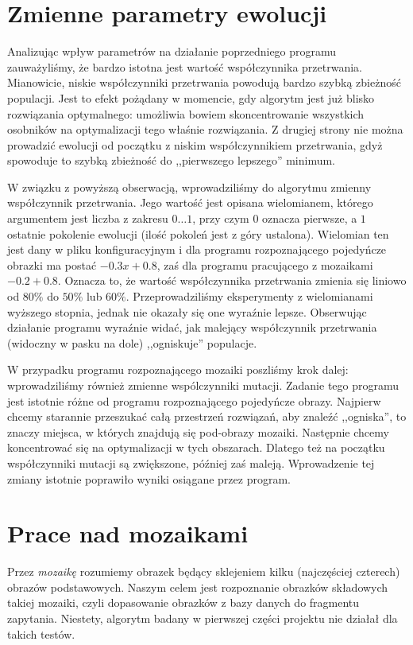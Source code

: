 \documentclass[a4paper,12pt,leqno]{article}
\begin{document}
\section{Zmienne parametry ewolucji}

Analizując wpływ parametrów na działanie poprzedniego programu zauważyliśmy, że bardzo istotna jest wartość współczynnika przetrwania. Mianowicie, niskie współczynniki przetrwania
powodują bardzo szybką zbieżność populacji. Jest to efekt pożądany w momencie, gdy algorytm jest już blisko rozwiązania optymalnego: umożliwia bowiem skoncentrowanie wszystkich
osobników na optymalizacji tego właśnie rozwiązania. Z drugiej strony nie można prowadzić ewolucji od początku z niskim współczynnikiem przetrwania, gdyż spowoduje to szybką
zbieżność do ,,pierwszego lepszego'' minimum.

W związku z powyższą obserwacją, wprowadziliśmy do algorytmu zmienny współczynnik przetrwania. Jego wartość jest opisana wielomianem, którego argumentem jest liczba z zakresu
$0 \dots 1$, przy czym $0$ oznacza pierwsze, a $1$ ostatnie pokolenie ewolucji (ilość pokoleń jest z góry ustalona). Wielomian ten jest dany w pliku konfiguracyjnym i dla programu
rozpoznającego pojedyńcze obrazki ma postać $-0.3x + 0.8$, zaś dla programu pracującego z mozaikami $-0.2 + 0.8$. Oznacza to, że wartość współczynnika przetrwania zmienia się
liniowo od $80\%$ do $50\%$ lub $60\%$. Przeprowadziliśmy eksperymenty z wielomianami wyższego stopnia, jednak nie okazały się one wyraźnie lepsze. Obserwując działanie programu
wyraźnie widać, jak malejący współczynnik przetrwania (widoczny w pasku na dole) ,,ogniskuje'' populacje.

W przypadku programu rozpoznającego mozaiki poszliśmy krok dalej: wprowadziliśmy również zmienne wspólczynniki mutacji. Zadanie tego programu jest istotnie różne od programu
rozpoznającego pojedyńcze obrazy. Najpierw chcemy starannie przeszukać całą przestrzeń rozwiązań, aby znaleźć ,,ogniska'', to znaczy miejsca, w których znajdują się pod-obrazy mozaiki.
Następnie chcemy koncentrować się na optymalizacji w tych obszarach. Dlatego też na początku współczynniki mutacji są zwiększone, później zaś maleją. Wprowadzenie tej zmiany istotnie
poprawiło wyniki osiągane przez program.

\section{Prace nad mozaikami}

Przez \textit{mozaikę} rozumiemy obrazek będący sklejeniem kilku (najczęściej czterech) obrazów podstawowych.
Naszym celem jest rozpoznanie obrazków składowych takiej mozaiki, czyli dopasowanie obrazków z bazy danych do fragmentu zapytania.
Niestety, algorytm badany w pierwszej części projektu nie działał dla takich testów.
\end{document}

